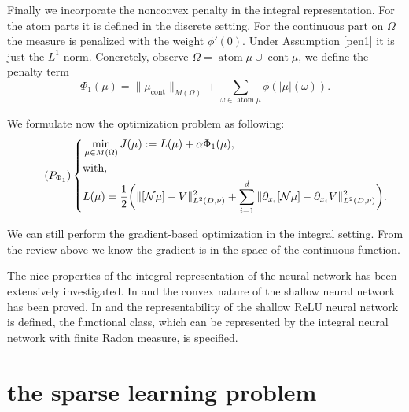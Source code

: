 \documentclass[12pt,fleqn]{amsart}
\theoremstyle{definition}
\DeclareMathOperator*{\atom}{atom}
\DeclareMathOperator*{\cont}{cont}
\begin{document}
Finally we incorporate the nonconvex penalty in the integral representation. 
For the atom parts it is defined in the discrete setting. 
For the continuous part on $\Omega$ the measure is penalized with the weight $\phi'(0)$. 
Under Assumption \ref{pen1} it is just the $L^1$ norm. 
Concretely, observe $\Omega = \atom \mu \cup \cont\mu $, we define the penalty term
\begin{equation}
	\Phi_1(\mu) = \|\mu_{\cont}\|_{M(\Omega)} + \sum_{\omega \in \atom \mu} \phi(|\mu|(\omega)).
\end{equation}

We formulate now the optimization problem as following:
\begin{equation}
	\label{int_noncon}
	\tag{$P_{\Phi_1}$}
	\left\{
	\begin{aligned}
	& \min_{\mu \in M(\Omega)} J (\mu):= L(\mu) + \alpha \Phi_1(\mu),\\
	& \text{with},\\
	& L(\mu) = \frac{1}{2} \bigg( \|[\mathcal{N}\mu] - V \|^2_{L^2(D, \nu)} + \sum_{i = 1}^d \|  \partial_{x_i}[\mathcal{N}\mu] - \partial_{x_i} V \|_{L^2(D, \nu)}^2 \bigg) .
	\end{aligned}
	\right.
\end{equation}

We can still perform the gradient-based optimization in the integral setting. 
From the review above we know the gradient is in the space of the continuous function. 

The nice properties of the integral representation of the neural network has been extensively investigated. In \cite{bengio2005convex} and \cite{neyshabur2014search} the convex nature of the shallow neural network has been proved. 
In \cite{ongie2019function} and \cite{savarese2019infinite} the representability of the shallow ReLU neural network is defined, the functional class, which can be represented by the integral neural network with finite Radon measure, is specified.


\section{the sparse learning problem}
\end{document}
